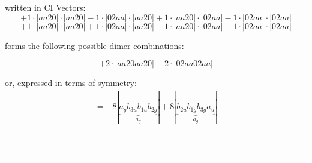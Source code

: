 \documentclass{article}
\begin{document}
\begin{minipage}{\linewidth}
written in CI Vectors: 
 $$+ 1 \cdot \left|aa20 \right| \cdot \left| aa20 \right| 
- 1 \cdot \left|02aa \right| \cdot \left| aa20 \right| 
+ 1 \cdot \left|aa20 \right| \cdot \left| 02aa \right| 
- 1 \cdot \left|02aa \right| \cdot \left| 02aa \right| 
 $$ $$ + 1 \cdot \left|aa20 \right| \cdot \left| aa20 \right| 
+ 1 \cdot \left|02aa \right| \cdot \left| aa20 \right| 
- 1 \cdot \left|aa20 \right| \cdot \left| 02aa \right| 
- 1 \cdot \left|02aa \right| \cdot \left| 02aa \right| 
$$



 forms the following possible dimer combinations:

$$+ 2 \cdot \left|aa20aa20 \right| - 2 \cdot \left|02aa02aa \right| $$



\end{minipage}
\vspace{0.5cm}


or, expressed in terms of symmetry:\begin{multline*}
=-8\left|\underbrace{a_{g} b_{3u} b_{1u} b_{2g}}_{a_{g}}\right|+8\left|\underbrace{b_{2u} b_{1g} b_{3g} a_{u}}_{a_{g}}\right|
\end{multline*}\\\\

 


\hrule
\vspace{0.5cm}
\end{document}
